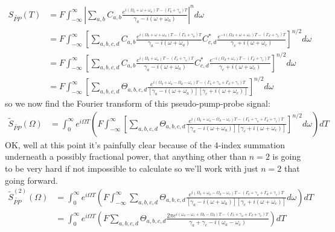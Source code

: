 \begin{align}
	S_{\tilde{PP}}( T)&= F \int_{-\infty}^{\infty} \left| \sum_{a,b} C_{a,b}  \frac{e^{i(\Omega_b + \omega + \omega_a)T- \left( \Gamma_b + \gamma_a \right)T}  }{\gamma_a - i \left(  \omega + \omega_a \right)} \right|^n d \omega \\
	&= F \int_{-\infty}^{\infty} \left[ \sum_{a,b, c, d} C_{a,b}  \frac{e^{i(\Omega_b + \omega + \omega_a)T- \left( \Gamma_b + \gamma_a \right)T}  }{\gamma_a - i \left(  \omega + \omega_a \right)} C_{c,d}^*  \frac{e^{-i(\Omega_d + \omega + \omega_c)T- \left( \Gamma_d + \gamma_c \right)T}  }{\gamma_c + i \left(  \omega + \omega_c \right)} \right]^{n/2} d \omega\\
	&= F \int_{-\infty}^{\infty} \left[ \sum_{a,b, c, d} C_{a,b}  \frac{e^{i(\Omega_b  + \omega_a)T- \left( \Gamma_b + \gamma_a \right)T}  }{\gamma_a - i \left(  \omega + \omega_a \right)} C_{c,d}^*  \frac{e^{-i(\Omega_d  + \omega_c)T- \left( \Gamma_d + \gamma_c \right)T}  }{\gamma_c + i \left(  \omega + \omega_c \right)} \right]^{n/2} d \omega\\
	&= F \int_{-\infty}^{\infty} \left[ \sum_{a,b, c, d} \Theta_{a,b, c, d}  \frac{e^{i(\Omega_b  + \omega_a - \Omega_d  - \omega_c )T- \left( \Gamma_b + \gamma_a + \Gamma_d + \gamma_c \right)T}  }{\left[ \gamma_a - i \left(  \omega + \omega_a \right) \right] \left[ \gamma_c + i \left(  \omega + \omega_c \right)  \right] } \right]^{n/2} d \omega
\end{align}
so we now find the Fourier transform of this pseudo-pump-probe signal:
\begin{align}
	 \tilde{S}_{\tilde{PP}}( \Omega )&= \int_{0}^{\infty} e^{i \Omega T}\left(   F \int_{-\infty}^{\infty} \left[ \sum_{a,b, c, d} \Theta_{a,b, c, d}  \frac{e^{i(\Omega_b  + \omega_a - \Omega_d  - \omega_c )T- \left( \Gamma_b + \gamma_a + \Gamma_d + \gamma_c \right)T}  }{\left[ \gamma_a - i \left(  \omega + \omega_a \right) \right] \left[ \gamma_c + i \left(  \omega + \omega_c \right)  \right] } \right]^{n/2} d \omega  \right) dT
\end{align}
OK, well at this point it's painfully clear because of the 4-index summation underneath a possibly fractional power, that anything other than $n = 2  $ is going to be very hard if not impossible to calculate so we'll work with just $n=2$ that going forward.
\begin{align}
	 \tilde{S}^{(2)}_{\tilde{PP}}( \Omega )&=\int_{0}^{\infty} e^{i \Omega T}\left(   F \int_{-\infty}^{\infty}  \sum_{a,b, c, d} \Theta_{a,b, c, d}  \frac{e^{i(\Omega_b  + \omega_a - \Omega_d  - \omega_c )T- \left( \Gamma_b + \gamma_a + \Gamma_d + \gamma_c \right)T}  }{\left[ \gamma_a - i \left(  \omega + \omega_a \right) \right] \left[ \gamma_c + i \left(  \omega + \omega_c \right)  \right] }  d \omega  \right) dT \\
	 &=\int_{0}^{\infty} e^{i \Omega T}\left(   F \sum_{a,b, c, d} \Theta_{a,b, c, d}   \frac{2 \pi e^{i \left( \omega_a - \omega_c + \Omega_b - \Omega_d \right)T -  \left( \Gamma_b + \gamma_a + \Gamma_d + \gamma_c \right)T}}{\gamma_a + \gamma_c - i (\omega_a - \omega_c) }  \right) dT
\end{align}
